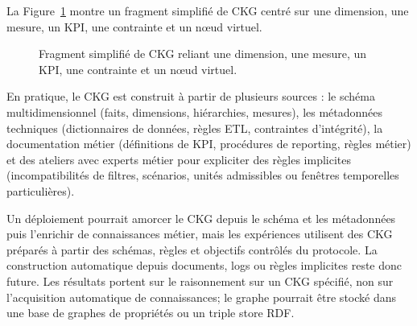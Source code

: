 \documentclass[journal]{IEEEtran}
\begin{document}
La Figure~\ref{fig:ckg-fragment} montre un fragment simplifié de CKG centré sur une dimension, une mesure, un KPI, une contrainte et un nœud virtuel.

\begin{figure}[!t]
\centering
{}
\caption{Fragment simplifié de CKG reliant une dimension, une mesure, un KPI, une contrainte et un nœud virtuel.}
\label{fig:ckg-fragment}
\end{figure}

En pratique, le CKG est construit à partir de plusieurs sources : le schéma multidimensionnel (faits, dimensions, hiérarchies, mesures), les métadonnées techniques (dictionnaires de données, règles ETL, contraintes d'intégrité), la documentation métier (définitions de KPI, procédures de reporting, règles métier) et des ateliers avec experts métier pour expliciter des règles implicites (incompatibilités de filtres, scénarios, unités admissibles ou fenêtres temporelles particulières).

Un déploiement pourrait amorcer le CKG depuis le schéma et les métadonnées puis l'enrichir de connaissances métier, mais les expériences utilisent des CKG préparés à partir des schémas, règles et objectifs contrôlés du protocole. La construction automatique depuis documents, logs ou règles implicites reste donc future. Les résultats portent sur le raisonnement sur un CKG spécifié, non sur l'acquisition automatique de connaissances; le graphe pourrait être stocké dans une base de graphes de propriétés ou un triple store RDF.
\end{document}
